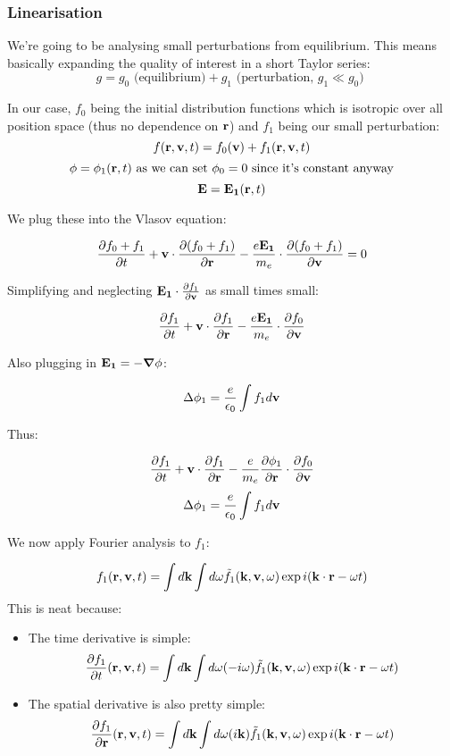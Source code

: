 \documentclass[PlasmaNotes.tex]{subfiles}
\begin{document}
\subsubsection{Linearisation}

We're going to be analysing small perturbations from equilibrium. This means basically expanding the quality of interest in a short Taylor series:
\[g=g_0 \text{ (equilibrium)} + g_1 \text{ (perturbation, $g_1 \ll g_0$) } \]

In our case, $f_0$ being the initial distribution functions which is isotropic over all position space (thus no dependence on $\mathbf{r}$) and $f_1$ being our small perturbation:
\[f(\mathbf{r}, \mathbf{v}, t) = f_0 (\mathbf{v}) + f_1(\mathbf{r}, \mathbf{v}, t) \]
\[\phi = \phi_1 (\mathbf{r}, t) \text{ as we can set $\phi_0 = 0$ since it's constant anyway} \]
\[\mathbf{E} = \mathbf{E_1} (\mathbf{r}, t)\]

We plug these into the Vlasov equation:

\[ \frac{\partial f_0 + f_1}{\partial t} + \mathbf{v} \cdot \frac{\partial (f_0 + f_1)}{\partial \mathbf{r}} - \frac{e \mathbf{E_1}}{m_e} \cdot \frac{\partial (f_0 + f_1)}{\partial \mathbf{v}} = 0 \]

Simplifying and neglecting $\mathbf{E_1} \cdot \frac{\partial f_1}{\partial \mathbf{v}}$ as small times small:

\[\frac{\partial f_1}{\partial t} + \mathbf{v} \cdot \frac{\partial f_1}{\partial \mathbf{r}} - \frac{e\mathbf{E_1}}{m_e} \cdot \frac{\partial f_0}{\partial \mathbf{v}}\]

Also plugging in $\mathbf{E_1} = -\mbox{\boldmath$ \nabla $} \phi$:

\[ \Delta \phi_1 = \frac{e}{\epsilon_0} \int f_1 d\mathbf{v} \]

Thus:

\[\frac{\partial f_1}{\partial t} + \mathbf{v} \cdot \frac{\partial f_1}{\partial \mathbf{r}} - \frac{e}{m_e}\frac{\partial \phi_1}{\partial \mathbf{r}} \cdot \frac{\partial f_0}{\partial \mathbf{v}}\]
\[ \Delta \phi_1 = \frac{e}{\epsilon_0} \int f_1 d\mathbf{v} \]

We now apply Fourier analysis to $f_1$:

\[ f_1 (\mathbf{r}, \mathbf{v}, t) = \int d\mathbf{k} \int d\omega \tilde{f_1} (\mathbf{k}, \mathbf{v}, \omega) \exp{i(\ensuremath{\mathbf{k}} \cdot \ensuremath{\mathbf{r}} - \omega t)} \]
This is neat because:
\begin{itemize}
\item The time derivative is simple:
\[ \frac{\partial f_1}{\partial t} (\mathbf{r}, \mathbf{v}, t) = \int d\mathbf{k} \int d\omega (-i\omega) \tilde{f_1} (\mathbf{k}, \mathbf{v}, \omega) \exp{i(\ensuremath{\mathbf{k}} \cdot \ensuremath{\mathbf{r}} - \omega t)} \]
\item The spatial derivative is also pretty simple:
\[ \frac{\partial f_1}{\partial \mathbf{r}} (\mathbf{r}, \mathbf{v}, t) = \int d\mathbf{k} \int d\omega (i\mathbf{k}) \tilde{f_1} (\mathbf{k}, \mathbf{v}, \omega) \exp{i(\ensuremath{\mathbf{k}} \cdot \ensuremath{\mathbf{r}} - \omega t)} \]
\end{itemize}
\end{document}
